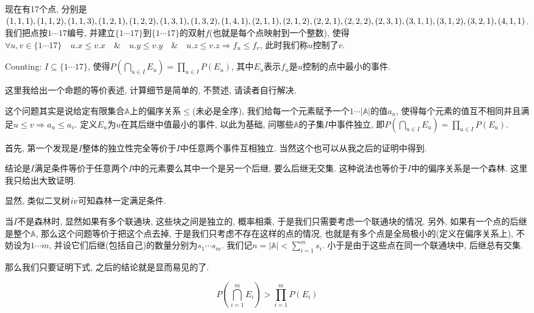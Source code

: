 	\begin{prob} [概率链]
		
		现在有17个点, 分别是$(1, 1, 1), (1, 1, 2), (1, 1, 3), (1, 2, 1), (1, 2, 2), (1, 3, 1), (1, 3, 2),\\ (1, 4, 1), (2, 1, 1), (2, 1, 2), (2, 2, 1), (2, 2, 2), (2, 3, 1), (3, 1, 1), (3, 1, 2), (3, 2, 1), (4, 1, 1)$. 我们把点按$1\cdots 17$编号, 并建立$\{1\cdots 17\}$到$\{1\cdots 17\}$的双射$f$(也就是每个点映射到一个整数), 使得$\forall u, v \in \{1\cdots 17\} \quad u.x \le v.x \quad \& \quad u.y \le v.y \quad \& \quad u.z \le v.z \Rightarrow f_u \le f_v$, 此时我们称$u$控制了$v$.
		
		Counting: $I \subseteq \{1 \cdots 17\}$, 使得$P(\bigcap\limits_{u \in I}E_u) = \prod\limits_{u \in I}P(E_u)$, 其中$E_u$表示$f_u$是$u$控制的点中最小的事件.
		
		\sol
		
		这里我给出一个命题的等价表述, 计算细节是简单的, 不赘述, 请读者自行解决.
		
		这个问题其实是说给定有限集合$\mathbb{A}$上的偏序关系$\le$(未必是全序), 我们给每一个元素赋予一个$1 \cdots |\mathbb{A}|$的值$a_u$, 使得每个元素的值互不相同并且满足$u \le v \Rightarrow a_u \le a_v$. 定义$E_u$为$u$在其后继中值最小的事件, 以此为基础, 问哪些$\mathbb{A}$的子集$I$中事件独立, 即$P(\bigcap\limits_{u \in I}E_u) = \prod\limits_{u \in I}P(E_u)$.
		
		首先, 第一个发现是$I$整体的独立性完全等价于$I$中任意两个事件互相独立. 当然这个也可以从我之后的证明中得到. 
		
		结论是$I$满足条件等价于任意两个$I$中的元素要么其中一个是另一个后继, 要么后继无交集. 这种说法也等价于$I$中的偏序关系是一个森林. 这里我只给出大致证明.
		
		显然, 类似二叉树$\uppercase\expandafter{\romannumeral4}$可知森林一定满足条件.
		
		当$I$不是森林时, 显然如果有多个联通块, 这些块之间是独立的, 概率相乘, 于是我们只需要考虑一个联通块的情况. 另外, 如果有一个点的后继是整个$\mathbb{A}$, 那么这个问题等价于把这个点去掉, 于是我们只考虑不存在这样的点的情况, 也就是有多个点是全局极小的(定义在偏序关系上), 不妨设为$1\cdots m$, 并设它们后继(包括自己)的数量分别为$s_1 \cdots s_m$. 我们记$n = |\mathbb{A}| < \sum\limits_{i = 1}^{m}s_i$. 小于是由于这些点在同一个联通块中, 后继总有交集.
		
		那么我们只要证明下式, 之后的结论就是显而易见的了.
		
		\begin{equation*}
			P(\bigcap\limits_{i=1}^{m}E_i) > \prod\limits_{i=1}^{m}P(E_i)
		\end{equation*}
		

\end{prob}
